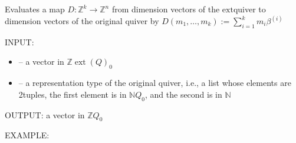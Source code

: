 \documentclass[letterpaper,10pt,english]{sphinxmanual}
\begin{document}
\begin{fulllineitems}
\label{\detokenize{index:quivercombinatorics.D_map}}
\pysigstartsignatures
\pysiglinewithargsret
{}
{\sphinxparamcomma {}}
{}
\pysigstopsignatures
\sphinxAtStartPar
Evaluates a map \(D:\mathbb{Z}^k\to\mathbb{Z}^n\) from dimension vectors of the \(\mathrm{ext}\)\sphinxhyphen{}quiver to dimension vectors of the original quiver by \(D(m_1,\dots,m_k):=\sum_{i=1}^k m_i\beta^{(i)}\)

\sphinxAtStartPar
INPUT:
\begin{itemize}
\item {} 
\sphinxAtStartPar
{} – a vector in \(\mathbb{Z}\operatorname{ext}(Q)_0\)

\item {} 
\sphinxAtStartPar
{} – a representation type of the original quiver, i.e., a list whose elements are 2\sphinxhyphen{}tuples, the first element is in \(\mathbb{N}Q_0\), and the second is in \(\mathbb{N}\)

\end{itemize}

\sphinxAtStartPar
OUTPUT: a vector in \(\mathbb{Z}Q_0\)

\sphinxAtStartPar
EXAMPLE:

\begin{sphinxVerbatim}[commandchars=\\\{\}]
  
   \PYG{p}{[}\PYG{p}{[}  \PYG{p}{]} \PYG{p}{[}  \PYG{p}{]} \PYG{p}{[}  \PYG{p}{]} \PYG{p}{[}  \PYG{p}{]}\PYG{p}{]}
     
 
\end{sphinxVerbatim}

\end{fulllineitems}
\end{document}
